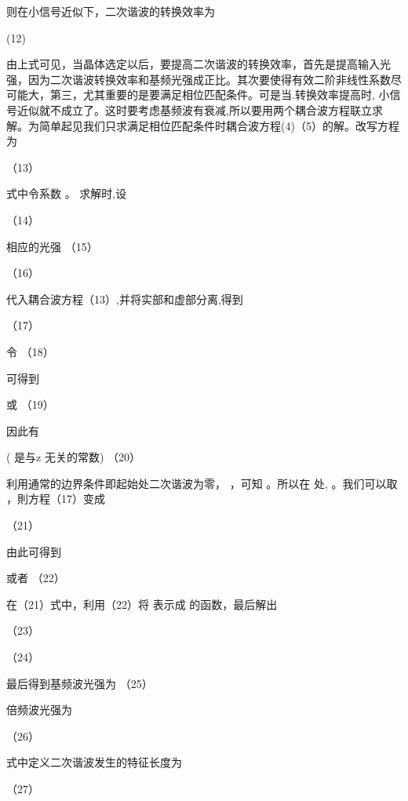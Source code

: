 则在小信号近似下，二次谐波的转换效率为

                  (12)

由上式可见，当晶体选定以后，要提高二次谐波的转换效率，首先是提高输入光强，因为二次谐波转换效率和基频光强成正比。其次要使得有效二阶非线性系数尽可能大，第三，尤其重要的是要满足相位匹配条件。可是当.转换效率提高时, 小信号近似就不成立了。这时要考虑基频波有衰减,所以要用两个耦合波方程联立求解。为简单起见我们只求满足相位匹配条件时耦合波方程(4)（5）的解。改写方程为

                                   （13）

式中令系数  。 求解时,设

                                   （14）

相应的光强                                                 （15）

                                                     （16）

代入耦合波方程（13）,并将实部和虚部分离,得到

                   （17）

令                                        （18）

可得到                

或                                      （19）

因此有

          ( 是与z 无关的常数)                  （20）

利用通常的边界条件即起始处二次谐波为零， ，可知   。所以在 处, 。我们可以取 ，則方程（17）变成 

                     （21）                      

由此可得到        

或者                          （22）

在（21）式中，利用（22）将 表示成 的函数，最后解出

                      （23）                           

                              （24）                       

最后得到基频波光强为                    （25）                

倍频波光强为

                   （26）                    

式中定义二次谐波发生的特征长度为                    

                                  （27）                    

